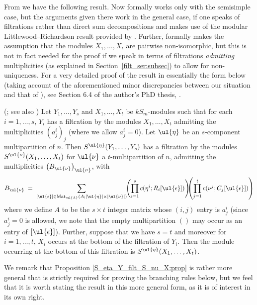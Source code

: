 From \cite{CHTAN} we have the following result. Now \cite{CHTAN} formally works only with the semisimple case, but the arguments given
there work in the general case, if one speaks of filtrations rather than direct sum decompositions and makes use of the  modular
Littlewood--Richardson result provided by \cite{JAMPEEL}. Further, \cite{CHTAN} formally makes the assumption that the modules
$X_1,\ldots,X_t$ are pairwise non-isomorphic, but this is not in fact needed for the proof if we speak in terms of filtrations
\textit{admitting} multiplicities (as explained in Section~\ref{filt_ser:subsec}) to allow for non-uniqueness. For a very detailed proof
of the result in essentially the form below (taking account of the aforementioned minor discrepancies between our situation and that of
\cite{CHTAN}), see Section 6.4 of the author's PhD thesis, \cite{PHDTHES}.

\begin{prop}\label{S_eta_Y_filt_S_nu_X:prop}\textup{(}\cite[Lemma 4.4, (1)]{CHTAN}; see also \cite[Proposition 6.4.1]{PHDTHES}\textup{)}
Let $Y_1,\ldots,Y_s$ and $X_1,\ldots,X_t$ be $kS_m$-modules such that for each $i=1,\ldots,s$, $Y_i$ has a filtration by the modules
$X_1,\ldots,X_t$ admitting the multiplicities $(a^i_j)_j$ (where we allow $a^i_j=0$). Let $\ul{\eta}$ be an $s$-component
multipartition of $n$. Then $S^{\ul{\eta}}(Y_1,\ldots,Y_s)$ has a filtration by the modules $S^{\ul{\nu}}(X_1,\ldots,X_t)$ for $\ul{\nu}$ a
$t$-multipartition of $n$, admitting the multiplicities $\left(B_{\ul{\nu}}\right)_{\ul{\nu}}$, with
\[
B_{\ul{\nu}} \;=\; \sum_{[\ul{\epsilon}] \in \mathrm{Mat}_{\ul{\Lambda}}(A;|\ul{\eta}|\times|\ul{\nu}|)}
\!\!\left(\prod^s_{i=1}c(\eta^i;R_i[\ul{\epsilon}])\right)\!\!\!\left(\prod^t_{j=1}c(\nu^j;C_j[\ul{\epsilon}])\right)
\]
where we define $A$ to be the $s \times t$ integer matrix whose $(i,j)$ entry is $a^i_j$ (since $a^i_j=0$ is allowed, we note
that the empty multipartition $()$ may occur as an entry of $[\ul{\epsilon}]$). Further, suppose that we have $s = t$
and moreover for $i=1,\ldots,t$, $X_i$ occurs at the bottom of the filtration of $Y_i$. Then the module occurring at the bottom of this
filtration is $S^{\ul{\eta}}(X_1,\ldots,X_t)$.
\end{prop}

We remark that Proposition \ref{S_eta_Y_filt_S_nu_X:prop} is rather more general that is strictly required for proving the branching
rules below, but we feel that it is worth stating the result in this more general form, as it is of interest in its own right.

